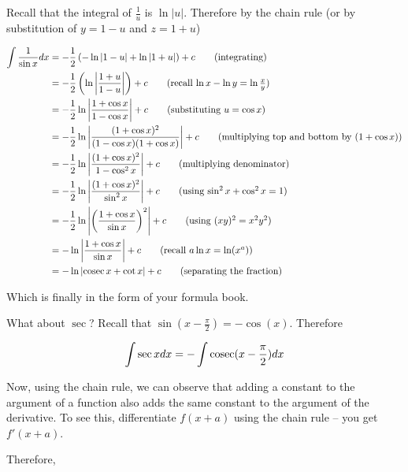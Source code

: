 \begin{solution}
    Recall that the integral of $\frac{1}{u}$ is $\ln | u|$. Therefore by the chain rule (or by substitution of $y = 1-u$ and $z = 1+u$)

    \begin{align*}
        \int \frac{1}{\sin x} dx &= - \frac{1}{2}\left(-\ln |1-u| + \ln |1+u| \right) +c \tag{integrating}\\
         &= - \frac{1}{2}\left( \ln \left| \frac{1+u}{1-u}\right|\right) +c \tag{recall $\ln x - \ln y = \ln \frac{x}{y}$}\\
         &= - \frac{1}{2}\ln \left| \frac{1+\cos x}{1-\cos x}\right| +c \tag{substituting $u = \cos x$}\\
         &= - \frac{1}{2}\ln \left| \frac{(1+\cos x)^2}{(1-\cos x)(1 + \cos x)}\right| +c \tag{multiplying top and bottom by $(1 + \cos x)$}\\
         &= - \frac{1}{2}\ln \left| \frac{(1+\cos x)^2}{1-\cos^2 x}\right| +c \tag{multiplying denominator}\\
         &= - \frac{1}{2}\ln \left| \frac{(1+\cos x)^2}{\sin^2 x}\right| +c \tag{using $\sin^2 x + \cos^2 x = 1$}\\
         &= - \frac{1}{2}\ln \left| \left(\frac{1+\cos x}{\sin x}\right)^2\right| +c \tag{using $(xy)^2 = x^2y^2$}\\
         &= - \ln \left| \frac{1+\cos x}{\sin x}\right| +c \tag{recall $a\ln x = \ln (x^a)$}\\
         &= - \ln \left| \cosec x + \cot x \right| +c \tag{separating the fraction}
    \end{align*}

    Which is finally in the form of your formula book.

    What about $\sec$? Recall that $\sin(x-\frac{\pi}{2}) = -\cos (x)$. Therefore 

    \[ \int \sec x dx =  - \int \operatorname{cosec} (x - \frac{\pi}{2}) dx\]

    Now, using the chain rule, we can observe that adding a constant to the argument of a function also adds the same constant to the argument of the derivative.
    To see this, differentiate $f(x+a)$ using the chain rule -- you get $f'(x+a)$.

    Therefore, 


\end{solution}
